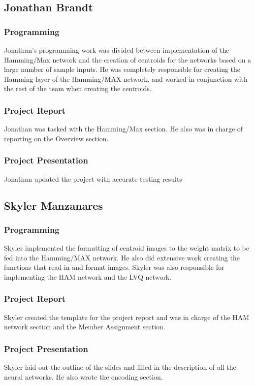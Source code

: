 \documentclass{article}
\begin{document}
\subsection{Jonathan Brandt}
\subsubsection{Programming}
Jonathan's programming work was divided between implementation of the 
Hamming/Max network and the creation of centroids for the networks based on a
large number of sample inputs. He was completely responsible for creating the Hamming layer of the Hamming/MAX network, and worked in conjunction with the rest of the team when creating the centroids. 

\subsubsection{Project Report}
Jonathan was tasked with the Hamming/Max section. He also was in charge of reporting on the Overview section.

\subsubsection{Project Presentation}
Jonathan updated the project with accurate testing results 

\subsection{Skyler Manzanares}

\subsubsection{Programming}
Skyler implemented the formatting of centroid images to the weight matrix to be fed into the Hamming/MAX network. He also did extensive work creating the functions that read in and format images. Skyler was also responsible for implementing
the HAM network and the LVQ network.

\subsubsection{Project Report}
Skyler created the template for the project report and was in charge of the HAM 
network section and the Member Assignment section.

\subsubsection{Project Presentation}
Skyler laid out the outline of the slides and filled in the description of all the neural networks. He also wrote the encoding section.
\end{document}

